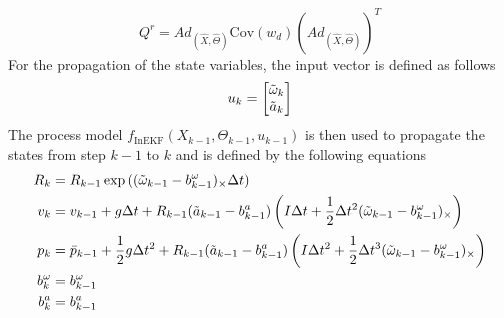 \begin{equation}
    Q^r = Ad_{(\hat{X},\hat{\Theta})} \mathrm{Cov}(w_d) (Ad_{(\hat{X},\hat{\Theta})})^T
    \label{eq: Q RInEKF}
\end{equation}
For the propagation of the state variables, the input vector is defined as follows
\begin{equation}
        u_k = \begin{bmatrix}
            \Tilde{\omega}_k \\
             \Tilde{a}_k \\
        \end{bmatrix} 
    \label{eq: inputs IMU InEKF}
\end{equation}
The process model $f_\text{InEKF}(X_{k-1},\Theta_{k-1},u_{k-1})$ is then used to propagate the states from step $k-1$ to $k$ and is defined by the following equations
\begin{subequations}
    \label{eq: f InEKF}
    \begin{align}
        R_k &= R_{k-1} \exp{( (\Tilde{\omega}_{k-1} - b^{\omega}_{k-1})_{\times} \Delta t)}\\
        v_k &= v_{k-1} + g \Delta t + R_{k-1} (\Tilde{a}_{k-1} - b^{a}_{k-1}) 
        \left( I \Delta t + \frac{1}{2} \Delta t^2 (\Tilde{\omega}_{k-1} - b^{\omega}_{k-1})_{\times} \right) \label{eq:v for f InEKF} \\
        p_k &= \bar{p}_{k-1} + \frac{1}{2} g \Delta t^2 + R_{k-1} (\Tilde{a}_{k-1} - b^{a}_{k-1}) 
        \left( I \Delta t^2 + \frac{1}{2} \Delta t^3 (\Tilde{\omega}_{k-1} - b^{\omega}_{k-1})_{\times} \right) \label{eq:p for f InEKF} \\
        b^{\omega}_{k} &= b^{\omega}_{k-1} \label{eq:b^(omega) for f InEKF}\\
        b^{a}_{k} &= b^{a}_{k-1} \label{eq:b^a for f InEKF} 
    \end{align}
\end{subequations}

